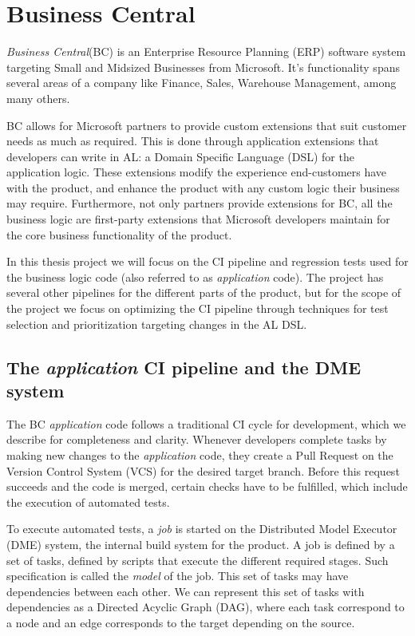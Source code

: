\section{Business Central}

\emph{Business Central}(BC) is an Enterprise Resource Planning (ERP) software 
system targeting Small and Midsized Businesses from Microsoft. It's functionality
spans several areas of a company like Finance, Sales, Warehouse Management, among
many others.

BC allows for Microsoft partners to provide custom extensions that suit customer
needs as much as required. This is done through application extensions that developers
can write in AL: a Domain Specific Language (DSL) for the application logic. 
These extensions modify the experience end-customers have with the product, and 
enhance the product with any custom logic their business may require.
Furthermore, not only partners provide extensions for BC, all the business logic
are first-party extensions that Microsoft developers maintain for the core business 
functionality of the product.

In this thesis project we will focus on the CI pipeline and regression tests
used for the business logic code (also referred to as \emph{application} code).
The project has several other pipelines for the different parts of the product,
but for the scope of the project we focus on optimizing the CI pipeline through
techniques for test selection and prioritization targeting changes in the AL DSL.

\subsection{The \emph{application} CI pipeline and the DME system}\label{s:bc-ci-dme}

The BC \emph{application} code follows a traditional CI cycle for development, which we describe 
for completeness and clarity. Whenever developers complete tasks by making new 
changes to the \emph{application} code, they create a Pull Request on the 
Version Control System (VCS) for the desired target branch. Before this request
succeeds and the code is merged, certain checks have to be fulfilled, which 
include the execution of automated tests.

To execute automated tests, a \emph{job} is started on the Distributed Model Executor (DME)
system, the internal build system for the product.  A job is defined by a set of 
tasks, defined by scripts that execute the different required stages. Such specification is
called the \emph{model} of the job. This set of tasks may have dependencies between each other. 
We can represent this set of tasks with dependencies as a Directed Acyclic Graph (DAG), where
each task correspond to a node and an edge corresponds to the target depending on the source.

